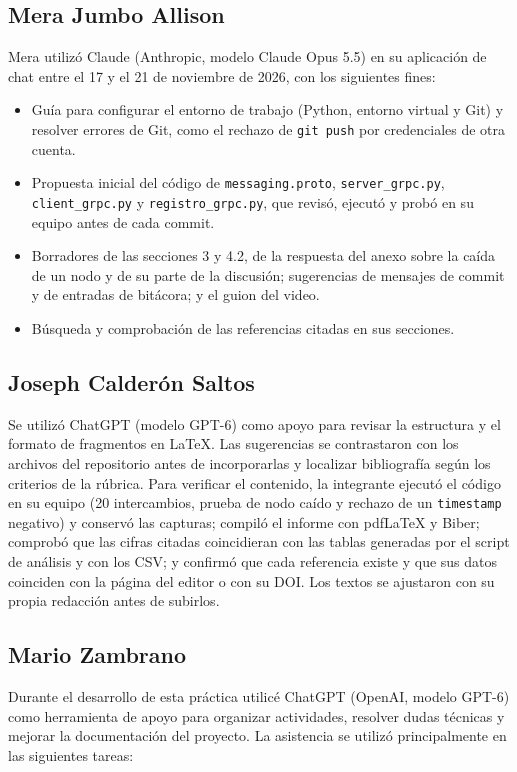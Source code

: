 
\subsection*{Mera Jumbo Allison}
Mera utilizó Claude (Anthropic, modelo Claude Opus 5.5) en su aplicación de chat entre el 17 y el 21 de noviembre de 2026, con los siguientes fines:
\begin{itemize}
  \item Guía para configurar el entorno de trabajo (Python, entorno virtual y Git) y resolver errores de Git, como el rechazo de \texttt{git push} por credenciales de otra cuenta.
  \item Propuesta inicial del código de \texttt{messaging.proto}, \texttt{server\_grpc.py}, \texttt{client\_grpc.py} y \texttt{registro\_grpc.py}, que revisó, ejecutó y probó en su equipo antes de cada commit.
  \item Borradores de las secciones 3 y 4.2, de la respuesta del anexo sobre la caída de un nodo y de su parte de la discusión; sugerencias de mensajes de commit y de entradas de bitácora; y el guion del video.
  \item Búsqueda y comprobación de las referencias citadas en sus secciones.
\end{itemize}
\subsection*{Joseph Calderón Saltos}
Se utilizó ChatGPT (modelo GPT-6) como apoyo para revisar la estructura y el formato de fragmentos en LaTeX. Las sugerencias se contrastaron con los archivos del repositorio antes de incorporarlas y localizar bibliografía según los criterios de la rúbrica.
Para verificar el contenido, la integrante ejecutó el código en su equipo (20 intercambios, prueba de nodo caído y rechazo de un \texttt{timestamp} negativo) y conservó las capturas; compiló el informe con pdfLaTeX y Biber; comprobó que las cifras citadas coincidieran con las tablas generadas por el script de análisis y con los CSV; y confirmó que cada referencia existe y que sus datos coinciden con la página del editor o con su DOI. Los textos se ajustaron con su propia redacción antes de subirlos.

\subsection*{Mario Zambrano}

Durante el desarrollo de esta práctica utilicé ChatGPT (OpenAI, modelo GPT-6) como herramienta de apoyo para organizar actividades, resolver dudas técnicas y mejorar la documentación del proyecto. La asistencia se utilizó principalmente en las siguientes tareas:

